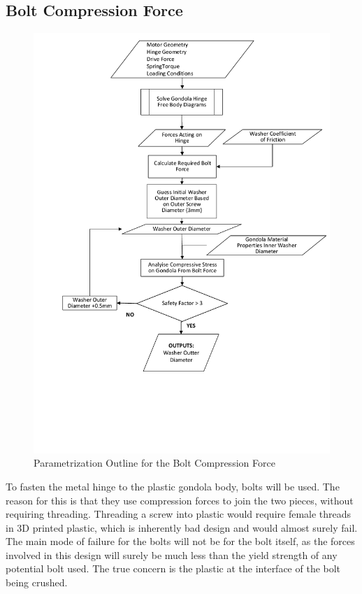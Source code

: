 \documentclass[../main.tex]{subfiles}
\begin{document}
\subsection{Bolt Compression Force} \label{compressive}

\begin{figure}[H]
	\centering
	\includegraphics[width=.9\linewidth]{img/paramaterization/compressionBolt.pdf}
	\caption{Parametrization Outline for the Bolt Compression Force}
	\label{fig:boltCompressionParametrization}
\end{figure}

To fasten the metal hinge to the plastic gondola body, bolts will be used. The reason for this is that they use compression forces to join the two pieces, without requiring threading. Threading a screw into plastic would require female threads in 3D printed plastic, which is inherently bad design and would almost surely fail. \\

The main mode of failure for the bolts will not be for the bolt itself, as the forces involved in this design will surely be much less than the yield strength of any potential bolt used. The true concern is the plastic at the interface of the bolt being crushed. \\
\end{document}
